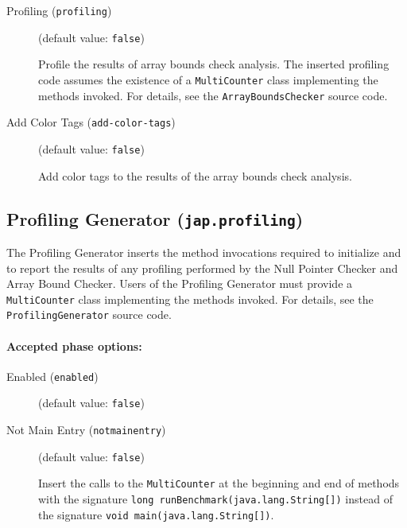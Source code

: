 \documentclass{article}
\begin{document}
\begin{description}
\item[Profiling ({\tt profiling})]
(default value: {\tt false})





\par

Profile the results of array bounds check analysis.  The inserted
profiling code assumes the existence of a {\tt MultiCounter}
class implementing the methods invoked. For details, see the
{\tt ArrayBoundsChecker} source code.



\item[Add Color Tags ({\tt add-color-tags})]
(default value: {\tt false})



Add color tags to the results of the array bounds check analysis.


\end{description}

\subsection{Profiling Generator ({\tt jap.profiling})}


\par

The Profiling Generator inserts the method invocations required
to initialize and to report the results of any profiling
performed by the Null Pointer Checker and Array Bound
Checker. Users of the Profiling Generator must provide a
{\tt MultiCounter} class implementing the methods invoked. For
details, see the {\tt ProfilingGenerator} source code.



\paragraph{Accepted phase options:} 

\begin{description}

\item[Enabled ({\tt enabled})]
(default value: {\tt false})






\item[Not Main Entry ({\tt notmainentry})]
(default value: {\tt false})





\par

Insert the calls to the {\tt MultiCounter} at the
beginning and end of methods with the signature
{\tt long runBenchmark(java.lang.String[])}
instead of the signature
{\tt void main(java.lang.String[])}.



\end{description}
\end{document}
